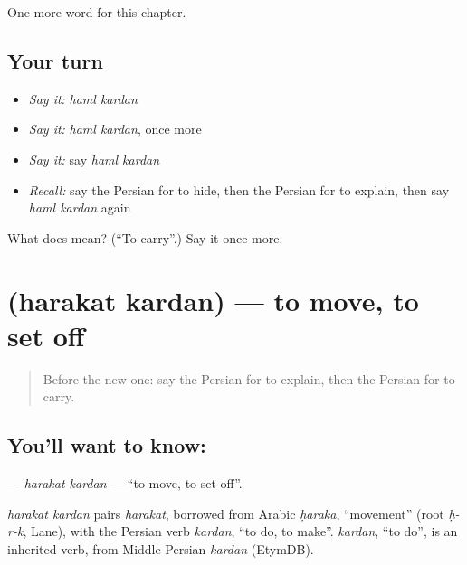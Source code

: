 \begin{grammarlens}[title={What you've built}]
One more word for this chapter.
\end{grammarlens}

\subsection*{Your turn}
\begin{itemize}
\raggedright
  \item \emph{Say it:} \emph{haml kardan}
  \item \emph{Say it:} \emph{haml kardan}, once more
  \item \emph{Say it:} say \emph{haml kardan}
  \item \emph{Recall:} say the Persian for to hide, then the Persian for to explain, then say \emph{haml kardan} again
\end{itemize}

\begin{tcolorbox}[breakable,colback=teal!4,colframe=teal!35!black,title={Before you move on}]
What does   mean? (\textquotedblleft{}To carry\textquotedblright{}.) Say it once more.
\end{tcolorbox}
\section[\texorpdfstring{\fa{حرکت} \fa{کردن} (harakat kardan)}{حرکت کردن (harakat kardan)}]{  (harakat kardan) — to move, to set off}

\label{lesson:FA-C223-harakat-kardan}



\begin{quote}
Before the new one: say the Persian for to explain, then the Persian for to carry.
\end{quote}

\subsection*{You'll want to know:  }
\textbf{ } — \emph{harakat kardan} — \textquotedblleft{}to move, to set off\textquotedblright{}.

\begin{cousinweb}
\emph{harakat kardan} pairs \emph{harakat}, borrowed from Arabic \emph{ḥaraka}, \textquotedblleft{}movement\textquotedblright{} (root \emph{ḥ-r-k}, Lane), with the Persian verb \emph{kardan}, \textquotedblleft{}to do, to make\textquotedblright{}. \emph{kardan}, \textquotedblleft{}to do\textquotedblright{}, is an inherited verb, from Middle Persian \emph{kardan} (EtymDB).
\end{cousinweb}

